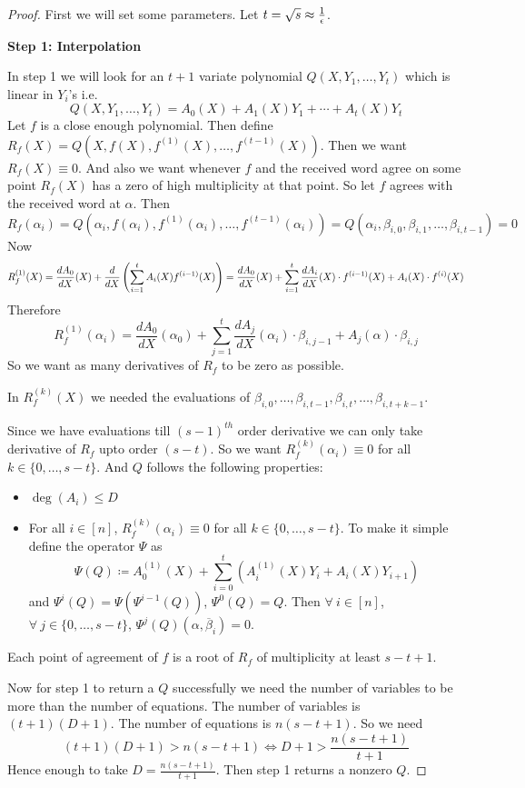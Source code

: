\begin{proof} First we will set some parameters. Let $t=\sqrt{s}\approx \frac1{\epsilon}$. 

    \textbf{Step 1: Interpolation}


In step 1 we will look for an $t+1$ variate polynomial $Q(X,Y_1,\dots, Y_t)$ which is linear in $Y_i$'s i.e. $$Q(X,Y_1,\dots, Y_t)=A_0(X)+A_1(X)Y_1+\cdots +A_t(X)Y_t$$Let $f$ is a close enough polynomial. Then define $R_f(X)=Q(X,f(X), f^{(1)}(X),\dots, f^{(t-1)}(X))$.  Then we want $R_f(X)\equiv 0$. And also we want whenever $f$ and the received word agree on some point $R_f(X)$ has a zero of high multiplicity at that point. So let $f$ agrees with the received word at $\alpha$. Then $$R_f(\alpha_i)=Q(\alpha_i, f(\alpha_i), f^{(1)}(\alpha_i),\dots, f^{(t-1)}(\alpha_i))=Q(\alpha_i, \beta_{i,0},\beta_{i,1},\dots, \beta_{i,t-1})=0$$Now \begin{align*}
            R_f^{(1)}(X)=\frac{dA_0}{dX}(X)+\frac{d}{dX}\left(\sum\limits_{i=1}^tA_i(X)f^{(i-1)}(X)\right)=\frac{dA_0}{dX}(X)+\sum\limits_{i=1}^t\frac{dA_i}{dX}(X)\cdot f^{(i-1)}(X)+A_i(X)\cdot f^{(i)}(X)
        \end{align*}Therefore $$ R_f^{(1)}(\alpha_i)=\frac{dA_0}{dX}(\alpha_0)+\sum\limits_{j=1}^t\frac{dA_j}{dX}(\alpha_i)\cdot \beta_{i,j-1}+A_j(\alpha)\cdot \beta_{i,j}$$ So we want as many derivatives of $R_f$ to be zero as possible. \begin{observation}
In $R_f^{(k)}(X)$ we needed the evaluations of $\beta_{i,0},\dots, \beta_{i,t-1},\beta_{i,t},\dots, \beta_{i,t+k-1}$.
\end{observation}Since we have evaluations till $(s-1)^{th}$ order derivative we can only take derivative of $R_f$ upto order $(s-t)$. So we want $R_f^{(k)}(\alpha_i)\equiv 0$ for all $k\in\{0,\dots, s-t\}$. And $Q$ follows the following properties:
\begin{itemize}
    \item $\deg(A_i)\leq D$ 
    \item For all $i\in[n]$, $R_f^{(k)}(\alpha_i)\equiv 0$ for all $k\in\{0,\dots, s-t\}$. To make it simple define the operator $\Psi$ as $$\Psi(Q)\coloneqq A_0^{(1)}(X)+ \sum\limits_{i=0}^t(A_i^{(1)}(X)Y_i+A_i(X)Y_{i+1})$$ and $\Psi^i(Q)=\Psi(\Psi^{i-1}(Q))$, $\Psi^0(Q)=Q$. Then $\forall\ i\in[n]$, $\forall\ j\in\{0,\dots, s-t\}$, $\Psi^j(Q)(\alpha,\overline{\beta}_i)=0$.
\end{itemize}
\begin{observation}
    Each point of agreement of $f$ is a root of $R_f$ of multiplicity at least $s-t+1$.
\end{observation}
Now for step 1 to return a $Q$ successfully we need the number of variables to be more than the number of equations. The number of variables is $(t+1)(D+1)$. The number of equations is $n(s-t+1)$. So we need $$(t+1)(D+1)>n(s-t+1)\iff D+1>\frac{n(s-t+1)}{t+1}$$Hence enough to take $D=\frac{n(s-t+1)}{t+1}$. Then step 1 returns a nonzero $Q$. 


\end{proof}
